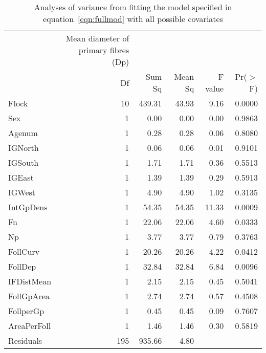 \begin{table}[ht]
\centering
\caption{Analyses of variance from fitting the model specified in equation~\ref{eqn:fullmod} with all possible covariates}
\label{tab:dpdsallaov}
\begin{tabular}{lrrrrr}
  \hline
\vspace{0.1in}
 & Mean diameter of primary fibres (Dp) & & & & \\
 & Df & Sum Sq & Mean Sq & F value & Pr($>$F) \\ 
  \hline
Flock       & 10 & 439.31 & 43.93 & 9.16 & 0.0000 \\ 
  Sex         & 1 & 0.00 & 0.00 & 0.00 & 0.9863 \\ 
  Agenum      & 1 & 0.28 & 0.28 & 0.06 & 0.8080 \\ 
  IGNorth     & 1 & 0.06 & 0.06 & 0.01 & 0.9101 \\ 
  IGSouth     & 1 & 1.71 & 1.71 & 0.36 & 0.5513 \\ 
  IGEast      & 1 & 1.39 & 1.39 & 0.29 & 0.5913 \\ 
  IGWest      & 1 & 4.90 & 4.90 & 1.02 & 0.3135 \\ 
  IntGpDens   & 1 & 54.35 & 54.35 & 11.33 & 0.0009 \\ 
  Fn          & 1 & 22.06 & 22.06 & 4.60 & 0.0333 \\ 
  Np          & 1 & 3.77 & 3.77 & 0.79 & 0.3763 \\ 
  FollCurv    & 1 & 20.26 & 20.26 & 4.22 & 0.0412 \\ 
  FollDep     & 1 & 32.84 & 32.84 & 6.84 & 0.0096 \\ 
  IFDistMean  & 1 & 2.15 & 2.15 & 0.45 & 0.5041 \\ 
  FollGpArea  & 1 & 2.74 & 2.74 & 0.57 & 0.4508 \\ 
  FollperGp   & 1 & 0.45 & 0.45 & 0.09 & 0.7607 \\ 
  AreaPerFoll & 1 & 1.46 & 1.46 & 0.30 & 0.5819 \\ 
  Residuals   & 195 & 935.66 & 4.80 &  &  \\ 
   \hline
  

\end{tabular}
\end{table}
